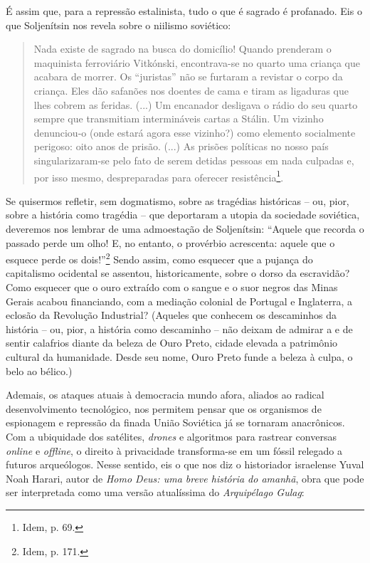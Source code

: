 É assim que, para a repressão estalinista, tudo o que é sagrado é
profanado. Eis o que Soljenítsin nos revela sobre o niilismo soviético:

\begin{quote}
Nada existe de sagrado na busca do domicílio! Quando prenderam o
maquinista ferroviário Vitkónski, encontrava-se no quarto uma criança
que acabara de morrer. Os ``juristas'' não se furtaram a revistar o
corpo da criança. Eles dão safanões nos doentes de cama e tiram as
ligaduras que lhes cobrem as feridas. (...) Um encanador desligava o
rádio do seu quarto sempre que transmitiam intermináveis cartas a
Stálin. Um vizinho denunciou-o (onde estará agora esse vizinho?) como
elemento socialmente perigoso: oito anos de prisão. (...) As prisões
políticas no nosso país singularizaram-se pelo fato de serem detidas
pessoas em nada culpadas e, por isso mesmo, despreparadas para oferecer
resistência\footnote{Idem, p. 69.}.
\end{quote}

Se quisermos refletir, sem dogmatismo, sobre as tragédias históricas --
ou, pior, sobre a história como tragédia -- que deportaram a utopia da
sociedade soviética, deveremos nos lembrar de uma admoestação de
Soljenítsin: ``Aquele que recorda o passado perde um olho! E, no
entanto, o provérbio acrescenta: aquele que o esquece perde os
dois!''\footnote{Idem, p. 171.} Sendo assim, como esquecer que a pujança
do capitalismo ocidental se assentou, historicamente, sobre o dorso da
escravidão? Como esquecer que o ouro extraído com o sangue e o suor
negros das Minas Gerais acabou financiando, com a mediação colonial de
Portugal e Inglaterra, a eclosão da Revolução Industrial? (Aqueles que
conhecem os descaminhos da história -- ou, pior, a história como
descaminho -- não deixam de admirar a e de sentir calafrios diante da
beleza de Ouro Preto, cidade elevada a patrimônio cultural da
humanidade. Desde seu nome, Ouro Preto funde a beleza à culpa, o belo ao
bélico.)

Ademais, os ataques atuais à democracia mundo afora, aliados ao radical
desenvolvimento tecnológico, nos permitem pensar que os organismos de
espionagem e repressão da finada União Soviética já se tornaram
anacrônicos. Com a ubiquidade dos satélites, \emph{drones} e algoritmos
para rastrear conversas \emph{online} e \emph{offline}, o direito à
privacidade transforma-se em um fóssil relegado a futuros arqueólogos.
Nesse sentido, eis o que nos diz o historiador israelense Yuval Noah
Harari, autor de \emph{Homo Deus: uma breve história do amanhã}, obra
que pode ser interpretada como uma versão atualíssima do
\emph{Arquipélago Gulag}:

